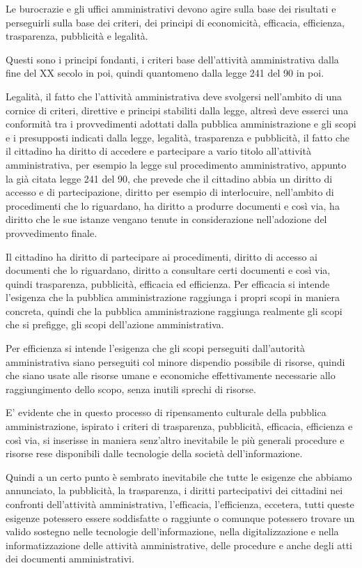 Le burocrazie e gli uffici amministrativi devono agire sulla base dei risultati e perseguirli sulla base dei criteri, dei principi di economicità, efficacia, efficienza, trasparenza, pubblicità e legalità. \par
Questi sono i principi fondanti, i criteri base dell'attività amministrativa dalla fine del XX secolo in poi, quindi quantomeno dalla legge 241 del 90 in poi.\par
Legalità, il fatto che l'attività amministrativa deve svolgersi nell'ambito di una cornice di criteri, direttive e principi stabiliti dalla legge, altresì deve esserci una conformità tra i provvedimenti adottati dalla pubblica amministrazione e gli scopi e i presupposti indicati dalla legge, legalità, trasparenza e pubblicità, il fatto che il cittadino ha diritto di accedere e partecipare a vario titolo all'attività amministrativa, per esempio la legge sul procedimento amministrativo, appunto la già citata legge 241 del 90, che prevede che il cittadino abbia un diritto di accesso e di partecipazione, diritto per esempio di interlocuire, nell'ambito di procedimenti che lo riguardano, ha diritto a produrre documenti e così via, ha diritto che le sue istanze vengano tenute in considerazione nell'adozione del provvedimento finale. \par
Il cittadino ha diritto di partecipare ai procedimenti, diritto di accesso ai documenti che lo riguardano, diritto a consultare certi documenti e così via, quindi trasparenza, pubblicità, efficacia ed efficienza.
Per efficacia si intende l'esigenza che la pubblica amministrazione raggiunga i propri scopi in maniera concreta, quindi che la pubblica amministrazione raggiunga realmente gli scopi che si prefigge, gli scopi dell'azione amministrativa. \par
Per efficienza si intende l'esigenza che gli scopi perseguiti dall'autorità amministrativa siano perseguiti col minore dispendio possibile di risorse, quindi che siano usate alle risorse umane e economiche effettivamente necessarie allo raggiungimento dello scopo, senza inutili sprechi di risorse.\par

E' evidente che in questo processo di ripensamento culturale della pubblica amministrazione, ispirato i criteri di trasparenza, pubblicità, efficacia, efficienza e così via, si inserisse in maniera senz'altro inevitabile le più generali procedure e risorse rese disponibili dalle tecnologie della società dell'informazione. 

Quindi a un certo punto è sembrato inevitabile che tutte le esigenze che abbiamo annunciato, la pubblicità, la trasparenza, i diritti partecipativi dei cittadini nei confronti dell'attività amministrativa, l'efficacia, l'efficienza, eccetera, tutti queste esigenze potessero essere soddisfatte o raggiunte o comunque potessero trovare un valido sostegno nelle tecnologie dell'informazione, nella digitalizzazione e nella informatizzazione delle attività amministrative, delle procedure e anche degli atti dei documenti amministrativi.

